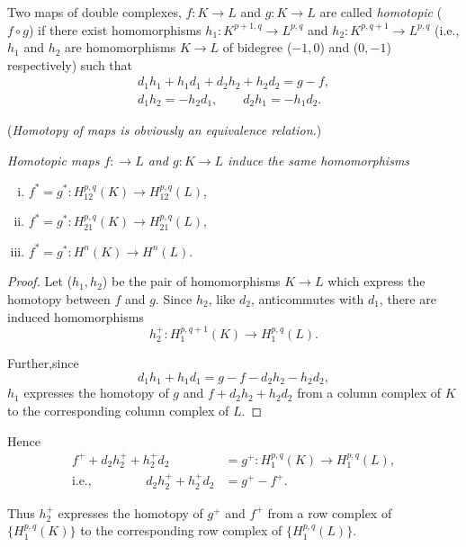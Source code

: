 \begin{defi*}%
Two maps of double complexes, $f: K \rightarrow L$ and $g: K 
\rightarrow L$ are called {\em homotopic} ($f \circ g$) if there exist
homomorphisms $h_1 : K^{p+1,q} \rightarrow L^{p,q}$ and  $h_2 :
K^{p,q+1} \rightarrow L^{p,q}$ (i.e., $h_1$ and $h_2$ are
homomorphisms $K \rightarrow L$ of bidegree ($-1, 0$) and ($0, -1$)
respectively) such that 
\begin{gather*}
d_1 h_1 + h_1 d_1 + d_2 h_2 + h_2 d_2 = g-f, \\
d_1 h_2 = - h_2 d_1, \qquad d_2 h_1 = -h_1 d_2. 
\end{gather*}
\end{defi*}
(\textit{Homotopy of maps is obviously an equivalence relation.})

\textit{Homotopic maps $f : \rightarrow L$ and $g : K \rightarrow L$
induce the same homomorphisms} 
\begin{enumerate}[(i)]
 \item $f^*  = g^* : H^{p,q}_{12}(K) \rightarrow H^{p,q}_{12}(L)$,
 \item $f^*  = g^* : H^{p,q}_{21}(K) \rightarrow H^{p,q}_{21}(L)$,
 \item $f^*  = g^* : H^n (K) \rightarrow H^n (L)$.
\end{enumerate}

\begin{proof}
Let ($h_1 , h_2$)  be the pair of homomorphisms $K \rightarrow L$
which express the homotopy between $f$ and $g$. Since $h_2$, like
$d_2$, anticommutes with $d_1$, there are induced homomorphisms 
$$
h^+_2 :  H^{p, q+1}_1 (K) \rightarrow  H^{p, q}_1 (L).
$$ 

Further,\pageoriginale since	
$$
d_1 h_1 + h_1 d_1 = g - f - d_2 h_2 - h_2 d_2,
$$
$h_1$ expresses the homotopy of $g$ and $f + d_2 h_2 + h_2 d_2$ from a
column complex of $K$ to the corresponding column complex of
$L$.
\end{proof}

 Hence 
\begin{align*}
f^+ + d_2 h^+_2 + h^+_2 d_2 & = g^+ :  H^{p, q}_1 (K) \rightarrow  H^{p,
  q}_1 (L), \\
\text{i.e., } \qquad \qquad 
d_2 h^+_2 + h^+_2 d_2 & = g^+ - f^+. \qquad 
\end{align*}

Thus $h^+_2$ expresses the homotopy of $g^+$ and $f^+$ from a row
complex of $\bigg\{  H^{p, q}_1 (K) \bigg\}$ to the corresponding row
complex of $\bigg\{  H^{p, q}_1 (L) \bigg\}$.  

